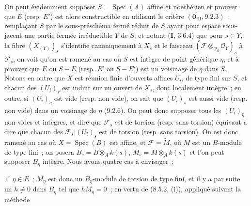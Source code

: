 On peut évidemment supposer $S=\operatorname{Spec}(A)$ affine et noethérien et
prouver que $E$ (resp. $E'$) est alors constructible en utilisant le critère
$(\mathbf 0_{\mathrm{III}},9.2.3)$~; remplaçant $S$ par le sous-préschéma fermé
réduit de $S$ ayant pour espace sous-jacent une partie fermée irréductible $Y$
de $S$, et notant (\textbf{I}, 3.6.4) que pour $s\in Y$, la fibre
$(X_{(Y)})_s$ s'identifie canoniquement à $X_s$ et le faisceau
$(\mathcal F\otimes_{\mathcal O_S}\mathcal O_Y)_s$ à $\mathcal F_s$, on voit
qu'on est ramené au cas où $S$ est intègre de point générique $\eta$, et à
prouver que $E$ ou $S-E$ (resp. $E'$ ou $S-E'$) est un voisinage de $\eta$
dans $S$. Notons en outre que $X$ est réunion finie d'ouverts affines $U_i$,
de type fini sur $S$, et chacun des $(U_i)_s$ est induit sur un ouvert de
$X_s$, donc localement intègre~; en outre, si $(U_i)_\eta$ est vide (resp. non
vide), on sait que $(U_i)_s$ est aussi vide (resp. non vide) dans un voisinage
de $\eta$ (9.2.6). On peut donc supposer tous les $(U_i)_\eta$ non vides et
intègres, et dire que $\mathcal F_s$ est de torsion (resp. sans torsion)
équivaut à dire que chacun des $\mathcal F_s|(U_i)_s$ est de torsion (resp.
sans torsion). On est donc ramené au cas où $X=\operatorname{Spec}(B)$ est
affine, et $\mathcal F=\widetilde M$, où $M$ est un $B$-module de type fini~;
on posera $B_s=B\otimes_A k(s)$, $M_s=M\otimes_A k(s)$ et l'on peut supposer
$B_\eta$ intègre. Nous avons quatre cas à envisager~:

$1^\circ$ $\eta\in E$~; $M_\eta$ est donc un $B_\eta$-module de torsion de
type fini, et il y a par suite un $h\neq0$ dans $B_\eta$ tel que
$hM_\eta=0$~; en vertu de (8.5.2, (i)), appliqué suivant la méthode

